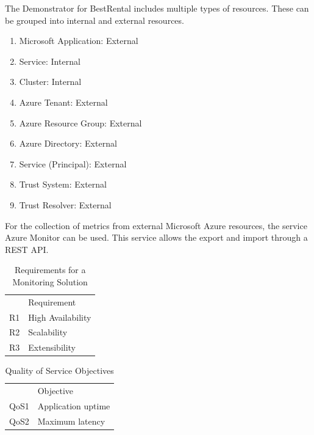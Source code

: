 The Demonstrator for BestRental includes multiple types of resources.
These can be grouped into internal and external resources.
\begin{enumerate}
    \item Microsoft Application: External
    \item Service: Internal
    \item Cluster: Internal
    \item Azure Tenant: External
    \item Azure Resource Group: External
    \item Azure Directory: External
    \item Service (Principal): External
    \item Trust System: External
    \item Trust Resolver: External
\end{enumerate}

For the collection of metrics from external Microsoft Azure resources, the service Azure Monitor can be used.
This service allows the export and import through a REST API.

\begin{table}[]
\begin{tabular}{ll}
   & Requirement       \\
R1 & High Availability \\
R2 & Scalability       \\
R3 & Extensibility    
\end{tabular}
\caption{Requirements for a Monitoring Solution}
\label{tab:requirements}
\end{table}

\begin{table}[]
\begin{tabular}{ll}
     & Objective                                   \\
QoS1 & Application uptime                          \\
QoS2 & Maximum latency                             \\
\end{tabular}
\caption{Quality of Service Objectives}
\label{tab:qos_objectives}
\end{table}


